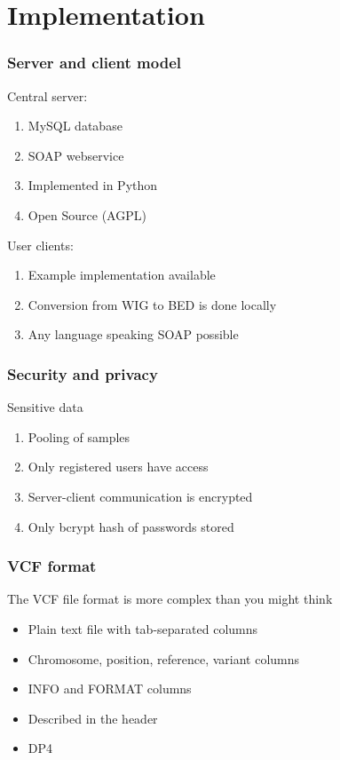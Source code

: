 \documentclass[slidestop]{beamer}
\begin{document}
\section{Implementation}

\begin{frame}
  \frametitle{Server and client model}
  Central server:
  \begin{enumerate}
    \item MySQL database
    \item SOAP webservice
    \item Implemented in Python
    \item Open Source (AGPL)
  \end{enumerate}
  User clients:
  \begin{enumerate}
    \item Example implementation available
    \item Conversion from WIG to BED is done locally
    \item Any language speaking SOAP possible
  \end{enumerate}
\end{frame}

\begin{frame}
  \frametitle{Security and privacy}
  Sensitive data
  \begin{enumerate}
    \item Pooling of samples
    \item Only registered users have access
    \item Server-client communication is encrypted
    \item Only bcrypt hash of passwords stored
  \end{enumerate}
\end{frame}

\begin{frame}
  \frametitle{VCF format}
  The VCF file format is more complex than you might think
  \begin{itemize}
    \item Plain text file with tab-separated columns
    \item Chromosome, position, reference, variant columns
    \item INFO and FORMAT columns
    \item Described in the header
    \item DP4
  \end{itemize}
\end{frame}
\end{document}
